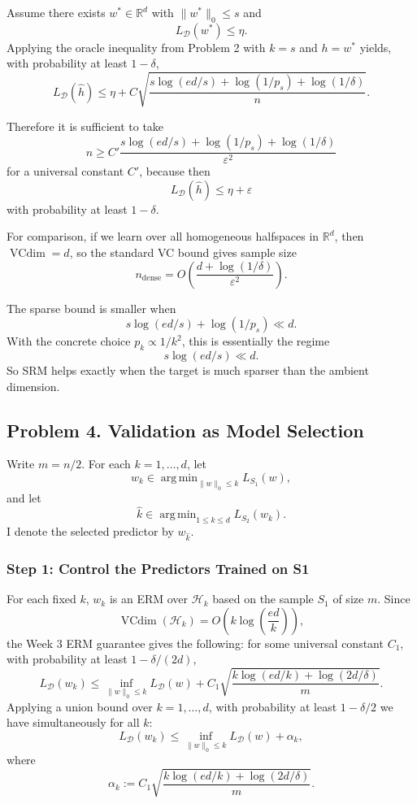 \documentclass{article}
\DeclareMathOperator{\VC}{VCdim}
\DeclareMathOperator*{\argmin}{arg\,min}
\newcommand{\cH}{\mathcal{H}}
\newcommand{\cD}{\mathcal{D}}
\begin{document}
Assume there exists $w^* \in \mathbb{R}^d$ with $\|w^*\|_0 \le s$ and
$$
L_{\cD}(w^*) \le \eta.
$$
Applying the oracle inequality from Problem 2 with $k=s$ and $h=w^*$ yields, with probability at least $1-\delta$,
$$
L_{\cD}(\widehat{h})
\le
\eta
+
C
\sqrt{
\frac{
s\log(ed/s)+\log(1/p_s)+\log(1/\delta)
}{n}
}.
$$

Therefore it is sufficient to take
$$
n
\ge
C'
\frac{
s\log(ed/s)+\log(1/p_s)+\log(1/\delta)
}{
\varepsilon^2
}
$$
for a universal constant $C'$, because then
$$
L_{\cD}(\widehat{h}) \le \eta+\varepsilon
$$
with probability at least $1-\delta$.

For comparison, if we learn over all homogeneous halfspaces in $\mathbb{R}^d$, then $\VC= d$, so the standard VC bound gives sample size
$$
n_{\mathrm{dense}}
=
O\!\left(
\frac{d+\log(1/\delta)}{\varepsilon^2}
\right).
$$

The sparse bound is smaller when
$$
s\log(ed/s)+\log(1/p_s) \ll d.
$$
With the concrete choice $p_k \propto 1/k^2$, this is essentially the regime
$$
s\log(ed/s) \ll d.
$$
So SRM helps exactly when the target is much sparser than the ambient dimension.

\subsection{Problem 4. Validation as Model Selection}

Write $m=n/2$. For each $k=1,\dots,d$, let
$$
w_k \in \argmin_{\|w\|_0\le k} L_{S_1}(w),
$$
and let
$$
\widehat{k}\in\argmin_{1\le k\le d} L_{S_2}(w_k).
$$
I denote the selected predictor by $w_{\widehat{k}}$.

\subsubsection{Step 1: Control the Predictors Trained on S1}

For each fixed $k$, $w_k$ is an ERM over $\cH_k$ based on the sample $S_1$ of size $m$. Since
$$
\VC(\cH_k)=O\!\left(k\log\!\left(\frac{ed}{k}\right)\right),
$$
the Week 3 ERM guarantee gives the following: for some universal constant $C_1$, with probability at least $1-\delta/(2d)$,
$$
L_{\cD}(w_k)
\le
\inf_{\|w\|_0\le k} L_{\cD}(w)
+
C_1
\sqrt{
\frac{
k\log(ed/k)+\log(2d/\delta)
}{m}
}.
$$
Applying a union bound over $k=1,\dots,d$, with probability at least $1-\delta/2$ we have simultaneously for all $k$:
$$
L_{\cD}(w_k)
\le
\inf_{\|w\|_0\le k} L_{\cD}(w)
+
\alpha_k,
$$
where
$$
\alpha_k
:=
C_1
\sqrt{
\frac{
k\log(ed/k)+\log(2d/\delta)
}{m}
}.
$$
\end{document}
